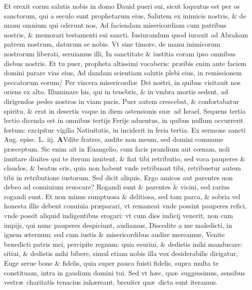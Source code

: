 \documentclass[a5paper,10pt]{book}
\def\ae{æ}
\def\oe{œ}
\begin{document}
\begin{multicols*}{2}
Et erexit cornu salutis nobis in domo Dauid pueri sui, sicut loquutus est per os sanctorum, qui a seculo sunt prophetarum eius, Salutem ex inimicis nostris, \& de manu omnium qui oderunt nos, Ad faciendam misericordiam cum patribus nostris, \& memorari testamenti sui sancti.
Iusiurandum quod iurauit ad Abraham patrem nostrum, daturum se nobis.
Vt sine timore, de manu inimicorum nostrorum liberati, seruiamus illi, In sanctitate \& iustitia coram ipso omnibus diebus nostris.
Et tu puer, propheta altissimi vocaberis: pr\ae ibis enim ante faciem domini parare vias eius, Ad dandam scientiam salutis plebi eius, in remissionem peccatorum eorum/
Per viscera misericordi\ae \ Dei nostri, in quibus visitauit nos oriens ex alto.
Illuminare his, qui in tenebris, \& in vmbra mortis sedent, ad dirigendos pedes nostros in viam pacis.
Puer autem crescebat, \& confortabatur spiritu, \& erat in desertis vsque in diem ostensionis su\ae \ ad Israel.
\newline {} \color{red} Sequens tertia lectio dicenda est in omnibus tertijs Ferijs aduentus, in quibus nullum occurrerit festum: excipitur vigilia Natiuitatis, in inciderit in feria tertia. \color{black}
\newline \color{red} Ex sermone sancti Aug. episc. L. iij. \color{black}
\vspace{-.25em}
\lettrine[lines=2]{\bfseries \color{red} A}{}Vdite fratres, audite non meum, sed domini commune pr\ae ceptum.
Sic enim ait in Euangelio, cum facis prandium aut c\oe nam, noli inuitare diuites qui te iterum inuitent, \& fiat tibi retributio, sed voca pauperes \& claudos, \& beatus eris, quia non habent vnde retribuant tibi, retribuetur autem tibi in retributione iustorum.
Sed dicit aliquis, Ergo amicos aut parentes non debeo ad conuiuium reuocare?
Rogandi sunt \& parentes \& vicini, sed rarius rogandi sunt.
Et non minus sumptuosa \& delitiosa, sed tam parca, \& sobria vel honesta illis debent conuiuia pr\ae parari, vt remaneat vnde possint pauperes refici, vnde possit aliquid indigentibus erogari: vt cum dies iudicij venerit, non cum impijs, qui nunc pauperes despiciunt, audiamus, Discedite a me maledicti, in ignem \ae ternum: sed cum iustis \& misericordibus audire mereamur, Venite benedicti patris mei, percipite regnum: quia esuriui, \& dedistis mihi manducare: sitiui, \& dedistis mihi bibere, simul etiam nobis illa vox desiderabilis dirigatur, Euge serue bone \& fidelis, quia super pauca fuisti fidelis, supra multa te constituam, intra in gaudium domini tui.
Sed vt h\ae c, qu\ae \ suggessimus, sensibus vestr\ae \ charitatis tenacius inh\ae reant, breuiter qu\ae \ dicta sunt iteramus.

\end{multicols*}
\end{document}
